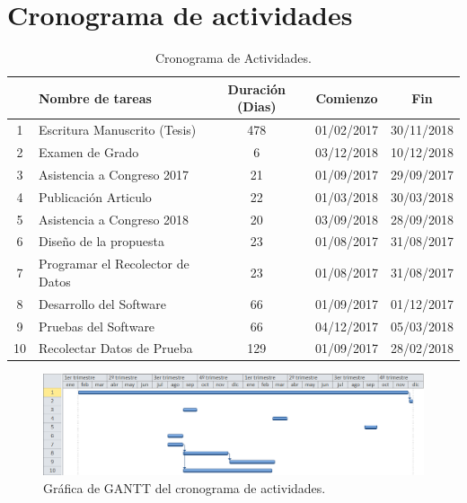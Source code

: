 
\section{Cronograma de actividades}

\begin{table}[ht]
\centering
\begin{tabular}{|c|l|c|c|c|}
\hline
  & Nombre de tareas & Duración (Dias) & Comienzo & Fin\tabularnewline
\hline
\hline
1 & Escritura Manuscrito (Tesis) & 478 & 01/02/2017 & 30/11/2018
\tabularnewline
\hline
2 & Examen de Grado & 6 & 03/12/2018 & 10/12/2018
\tabularnewline
\hline
3 & Asistencia a Congreso 2017 & 21 & 01/09/2017 & 29/09/2017
\tabularnewline
\hline
4 & Publicación Articulo & 22 & 01/03/2018 & 30/03/2018
\tabularnewline
\hline
5 & Asistencia a Congreso 2018 & 20 & 03/09/2018 & 28/09/2018
\tabularnewline
\hline
6 & Diseño de la propuesta & 23 & 01/08/2017 & 31/08/2017
\tabularnewline
\hline
7 & Programar el Recolector de Datos & 23 & 01/08/2017 & 31/08/2017
\tabularnewline
\hline
8 & Desarrollo del Software & 66 & 01/09/2017 & 01/12/2017
\tabularnewline
\hline
9 & Pruebas del Software & 66 & 04/12/2017 & 05/03/2018
\tabularnewline
\hline
10 & Recolectar Datos de Prueba & 129 & 01/09/2017 & 28/02/2018
\tabularnewline
\hline
\end{tabular}
\caption{Cronograma de Actividades.}
\end{table}


\begin{figure}[h]
\centering
\includegraphics[width=1.0\columnwidth]{./CapituloI/Imagenes/Cronograma.PNG}
\caption{Gráfica de GANTT del cronograma de actividades.}
\end{figure}